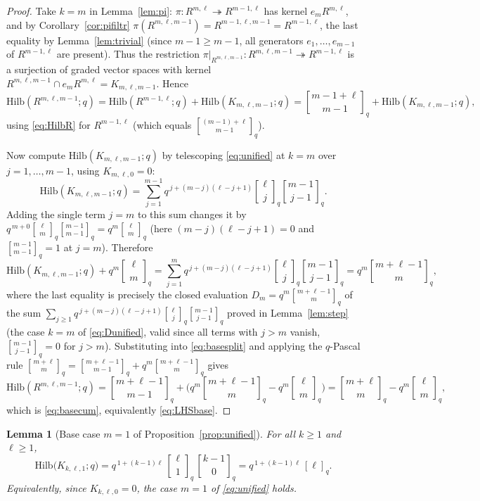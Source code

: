 \documentclass{amsart}
\newtheorem{lemma}{Lemma}
\theoremstyle{definition}
\newcommand{\Hilb}{\mathrm{Hilb}}
\newcommand{\qbin}[2]{\genfrac{[}{]}{0pt}{}{#1}{#2}_q}
\begin{document}
\begin{proof}
Take $k=m$ in Lemma~\ref{lem:pi}: $\pi\colon R^{m,\ell}\twoheadrightarrow
R^{m-1,\ell}$ has kernel $e_m R^{m,\ell}$, and by Corollary~\ref{cor:pifiltr}
$\pi(R^{m,\ell,m-1})=R^{m-1,\ell,m-1}=R^{m-1,\ell}$, the last equality by
Lemma~\ref{lem:trivial} (since $m-1\ge m-1$, all generators $e_1,\dots,e_{m-1}$ of
$R^{m-1,\ell}$ are present). Thus the restriction
$\pi|_{R^{m,\ell,m-1}}\colon R^{m,\ell,m-1}\twoheadrightarrow R^{m-1,\ell}$ is a
surjection of graded vector spaces with kernel
$R^{m,\ell,m-1}\cap e_mR^{m,\ell}=K_{m,\ell,m-1}$. Hence
\begin{equation}\label{eq:basesplit}
\Hilb(R^{m,\ell,m-1};q)=\Hilb(R^{m-1,\ell};q)+\Hilb(K_{m,\ell,m-1};q)
=\qbin{m-1+\ell}{m-1}+\Hilb(K_{m,\ell,m-1};q),
\end{equation}
using \eqref{eq:HilbR} for $R^{m-1,\ell}$ (which equals
$\qbin{(m-1)+\ell}{m-1}$).

Now compute $\Hilb(K_{m,\ell,m-1};q)$ by telescoping \eqref{eq:unified} at $k=m$ over
$j=1,\dots,m-1$, using $K_{m,\ell,0}=0$:
\[
\Hilb(K_{m,\ell,m-1};q)
=\sum_{j=1}^{m-1}q^{\,j+(m-j)(\ell-j+1)}\qbin{\ell}{j}\qbin{m-1}{j-1}.
\]
Adding the single term $j=m$ to this sum changes it by
$q^{\,m+0}\qbin{\ell}{m}\qbin{m-1}{m-1}=q^{m}\qbin{\ell}{m}$ (here $(m-j)(\ell-j+1)=0$
and $\qbin{m-1}{m-1}=1$ at $j=m$). Therefore
\[
\Hilb(K_{m,\ell,m-1};q)+q^{m}\qbin{\ell}{m}
=\sum_{j=1}^{m}q^{\,j+(m-j)(\ell-j+1)}\qbin{\ell}{j}\qbin{m-1}{j-1}
=q^{m}\qbin{m+\ell-1}{m},
\]
where the last equality is precisely the closed evaluation $D_m=q^{m}\qbin{m+\ell-1}{m}$
of the sum $\sum_{j\ge1}q^{\,j+(m-j)(\ell-j+1)}\qbin{\ell}{j}\qbin{m-1}{j-1}$ proved in
Lemma~\ref{lem:step} (the case $k=m$ of \eqref{eq:Dunified}, valid since all terms
with $j>m$ vanish, $\qbin{m-1}{j-1}=0$ for $j>m$). Substituting into
\eqref{eq:basesplit} and applying the $q$-Pascal rule
$\qbin{m+\ell}{m}=\qbin{m+\ell-1}{m-1}+q^{m}\qbin{m+\ell-1}{m}$ gives
\[
\Hilb(R^{m,\ell,m-1};q)
=\qbin{m+\ell-1}{m-1}+\big(q^{m}\qbin{m+\ell-1}{m}-q^{m}\qbin{\ell}{m}\big)
=\qbin{m+\ell}{m}-q^{m}\qbin{\ell}{m},
\]
which is \eqref{eq:basecum}, equivalently \eqref{eq:LHSbase}.
\end{proof}

\begin{lemma}[Base case $m=1$ of Proposition~\ref{prop:unified}]\label{lem:unifiedm1}
For all $k\ge1$ and $\ell\ge1$,
\begin{equation}\label{eq:unifiedm1}
\Hilb\!\big(K_{k,\ell,1};q\big)=q^{\,1+(k-1)\ell}\,\qbin{\ell}{1}\,\qbin{k-1}{0}
=q^{\,1+(k-1)\ell}\,[\ell]_q .
\end{equation}
Equivalently, since $K_{k,\ell,0}=0$, the case $m=1$ of \eqref{eq:unified} holds.
\end{lemma}
\end{document}
